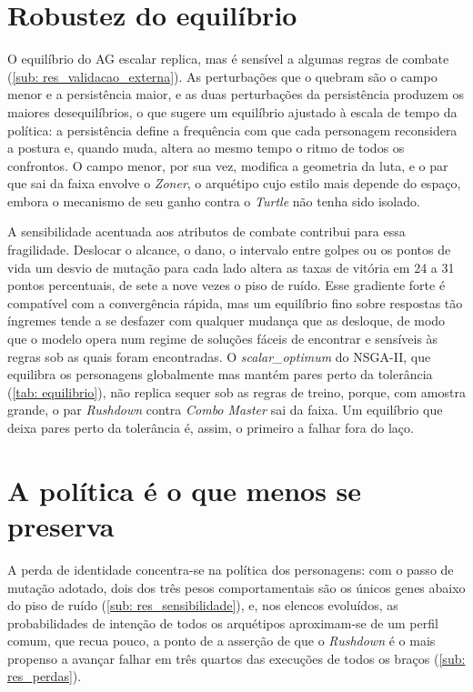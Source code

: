 \section{Robustez do equilíbrio}
\label{sec: disc_robustez}

O equilíbrio do AG escalar replica, mas é sensível a algumas regras de combate (\autoref{sub: res_validacao_externa}). As perturbações que o quebram são o campo menor e a persistência maior, e as duas perturbações da persistência produzem os maiores desequilíbrios, o que sugere um equilíbrio ajustado à escala de tempo da política: a persistência define a frequência com que cada personagem reconsidera a postura e, quando muda, altera ao mesmo tempo o ritmo de todos os confrontos. O campo menor, por sua vez, modifica a geometria da luta, e o par que sai da faixa envolve o \textit{Zoner}, o arquétipo cujo estilo mais depende do espaço, embora o mecanismo de seu ganho contra o \textit{Turtle} não tenha sido isolado.

A sensibilidade acentuada aos atributos de combate contribui para essa fragilidade. Deslocar o alcance, o dano, o intervalo entre golpes ou os pontos de vida um desvio de mutação para cada lado altera as taxas de vitória em 24 a 31 pontos percentuais, de sete a nove vezes o piso de ruído. Esse gradiente forte é compatível com a convergência rápida, mas um equilíbrio fino sobre respostas tão íngremes tende a se desfazer com qualquer mudança que as desloque, de modo que o modelo opera num regime de soluções fáceis de encontrar e sensíveis às regras sob as quais foram encontradas. O \textit{scalar\_optimum} do NSGA-II, que equilibra os personagens globalmente mas mantém pares perto da tolerância (\autoref{tab: equilibrio}), não replica sequer sob as regras de treino, porque, com amostra grande, o par \textit{Rushdown} contra \textit{Combo Master} sai da faixa. Um equilíbrio que deixa pares perto da tolerância é, assim, o primeiro a falhar fora do laço.

\section{A política é o que menos se preserva}
\label{sec: disc_politica}

A perda de identidade concentra-se na política dos personagens: com o passo de mutação adotado, dois dos três pesos comportamentais são os únicos genes abaixo do piso de ruído (\autoref{sub: res_sensibilidade}), e, nos elencos evoluídos, as probabilidades de intenção de todos os arquétipos aproximam-se de um perfil comum, que recua pouco, a ponto de a asserção de que o \textit{Rushdown} é o mais propenso a avançar falhar em três quartos das execuções de todos os braços (\autoref{sub: res_perdas}).

